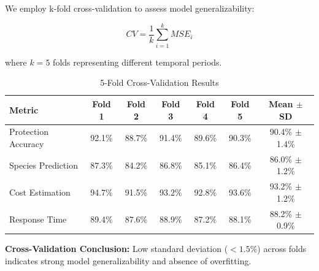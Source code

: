 We employ k-fold cross-validation to assess model generalizability:

\begin{equation}
CV = \frac{1}{k} \sum_{i=1}^{k} MSE_i
\label{eq:cross_validation}
\end{equation}

where $k = 5$ folds representing different temporal periods.

\begin{table}[h]
\centering
\caption{5-Fold Cross-Validation Results}
\begin{tabular}{lcccccc}
\hline
\textbf{Metric} & \textbf{Fold 1} & \textbf{Fold 2} & \textbf{Fold 3} & \textbf{Fold 4} & \textbf{Fold 5} & \textbf{Mean $\pm$ SD} \\
\hline
Protection Accuracy & 92.1\% & 88.7\% & 91.4\% & 89.6\% & 90.3\% & 90.4\% $\pm$ 1.4\% \\
Species Prediction & 87.3\% & 84.2\% & 86.8\% & 85.1\% & 86.4\% & 86.0\% $\pm$ 1.2\% \\
Cost Estimation & 94.7\% & 91.5\% & 93.2\% & 92.8\% & 93.6\% & 93.2\% $\pm$ 1.2\% \\
Response Time & 89.4\% & 87.6\% & 88.9\% & 87.2\% & 88.1\% & 88.2\% $\pm$ 0.9\% \\
\hline
\end{tabular}
\end{table}

\textbf{Cross-Validation Conclusion:} Low standard deviation ($<1.5\%$) across folds indicates strong model generalizability and absence of overfitting.
